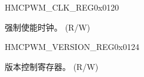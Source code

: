 \begin{register}{H}{MCPWM\_CLK\_REG}{0x{}0120}\label{regdesc:MCPWMCLKREG}
%
%
\regnewline%
\begin{regdesc}\begin{reglist}
\label{fielddesc:MCPWMCLKEN}\item [MCPWM\_CLK\_EN] 强制使能时钟。 (R/W)
\end{reglist}\end{regdesc}
\end{register}


\begin{register}{H}{MCPWM\_VERSION\_REG}{0x{}0124}\label{regdesc:MCPWMVERSIONREG}
%
%
\regnewline%
\begin{regdesc}\begin{reglist}
\label{fielddesc:MCPWMDATE}\item [MCPWM\_DATE] 版本控制寄存器。 (R/W)
\end{reglist}\end{regdesc}
\end{register}


